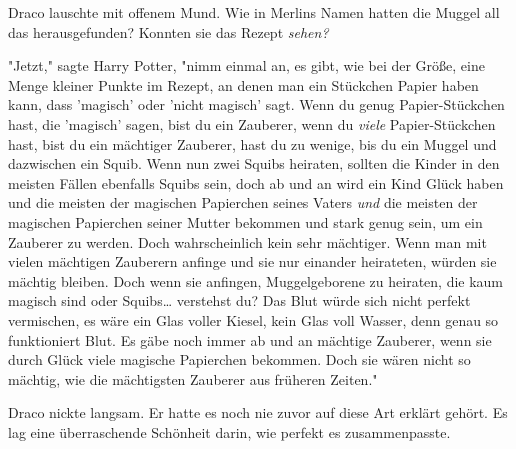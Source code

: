 {Draco lauschte mit offenem Mund. Wie in Merlins Namen hatten die Muggel all das herausgefunden? Konnten sie das Rezept \emph{sehen?}

"Jetzt," sagte Harry Potter, "nimm einmal an, es gibt, wie bei der Größe, eine Menge kleiner Punkte im Rezept, an denen man ein Stückchen Papier haben kann, dass 'magisch' oder 'nicht magisch' sagt. Wenn du genug Papier-Stückchen hast, die 'magisch' sagen, bist du ein Zauberer, wenn du \emph{viele} Papier-Stückchen hast, bist du ein mächtiger Zauberer, hast du zu wenige, bis du ein Muggel und dazwischen ein Squib. Wenn nun zwei Squibs heiraten, sollten die Kinder in den meisten Fällen ebenfalls Squibs sein, doch ab und an wird ein Kind Glück haben und die meisten der magischen Papierchen seines Vaters \emph{und} die meisten der magischen Papierchen seiner Mutter bekommen und stark genug sein, um ein Zauberer zu werden. Doch wahrscheinlich kein sehr mächtiger. Wenn man mit vielen mächtigen Zauberern anfinge und sie nur einander heirateten, würden sie mächtig bleiben. Doch wenn sie anfingen, Muggelgeborene zu heiraten, die kaum magisch sind oder Squibs… verstehst du? Das Blut würde sich nicht perfekt vermischen, es wäre ein Glas voller Kiesel, kein Glas voll Wasser, denn genau so funktioniert Blut. Es gäbe noch immer ab und an mächtige Zauberer, wenn sie durch Glück viele magische Papierchen bekommen. Doch sie wären nicht so mächtig, wie die mächtigsten Zauberer aus früheren Zeiten."

Draco nickte langsam. Er hatte es noch nie zuvor auf diese Art erklärt gehört. Es lag eine überraschende Schönheit darin, wie perfekt es zusammenpasste.

}
